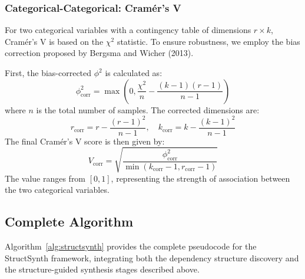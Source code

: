 \subsubsection{Categorical-Categorical: Cramér's V}
For two categorical variables with a contingency table of dimensions $r \times k$, Cramér's V is based on the $\chi^2$ statistic. To ensure robustness, we employ the bias correction proposed by Bergsma and Wicher (2013).

First, the bias-corrected $\phi^2$ is calculated as:
\begin{equation}
    \phi^2_{\text{corr}} = \max\left(0, \frac{\chi^2}{n} - \frac{(k-1)(r-1)}{n-1}\right)
\end{equation}
where $n$ is the total number of samples. The corrected dimensions are:
\begin{equation}
    r_{\text{corr}} = r - \frac{(r-1)^2}{n-1}, \quad k_{\text{corr}} = k - \frac{(k-1)^2}{n-1}
\end{equation}
The final Cramér's V score is then given by:
\begin{equation}
    V_{\text{corr}} = \sqrt{\frac{\phi^2_{\text{corr}}}{\min(k_{\text{corr}}-1, r_{\text{corr}}-1)}}
\end{equation}
The value ranges from $[0, 1]$, representing the strength of association between the two categorical variables.

\subsection{Complete Algorithm}
\label{sec:algorithm}

Algorithm~\ref{alg:structsynth} provides the complete pseudocode for the \textsf{StructSynth} framework, integrating both the dependency structure discovery and the structure-guided synthesis stages described above.

